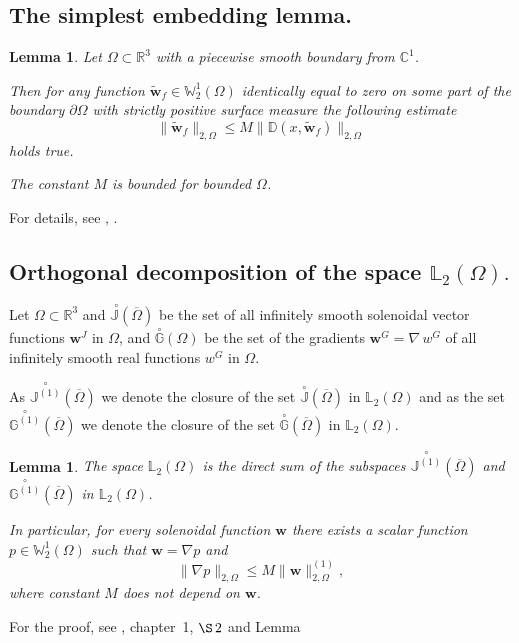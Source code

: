 \documentclass{article}
\theoremstyle{plain}
\newtheorem{lemma}[theorem]{Lemma}
\theoremstyle{definition}
\numberwithin{equation}{section}
\begin{document}
\subsection{The simplest embedding lemma.}

\begin{lemma}\label{l2.8}
Let $\Omega\subset\mathbb{R}^{3}$ with a piecewise smooth boundary from $\mathbb{C}^{1}$.

Then for any function $\widetilde{\boldsymbol{w}}_{f}\in\mathbb{W}^{1}_{2}(\Omega)$ identically equal to zero on some part of the boundary $\partial\Omega$ with strictly positive surface measure the following estimate
\begin{equation}\label{eq2.8}
\|\widetilde{\boldsymbol{w}}_{f}\|_{2,\Omega}\leqslant{M}
\|\mathbb{D}(x,\widetilde{\boldsymbol{w}}_{f})\|_{2,\Omega}
\end{equation}
holds true.

The constant ${M}$ is bounded for bounded $\Omega$.
\end{lemma}
For details, see \cite{5}, \cite{21}.

\subsection{Orthogonal decomposition of the space $\mathbb{L}_{2}(\Omega).$}

Let $\Omega\subset\mathbb{R}^{3}$ and $\stackrel{\,\,\!\!\circ}{\mathbb{J}}(\overline{\Omega})$ be the set of all infinitely smooth solenoidal vector functions $\boldsymbol{w}^{J}$ in $\Omega$, and $\stackrel{\!\!\circ}{\mathbb{G}}(\Omega)$ be the set of the gradients $\boldsymbol{w}^{G}=\nabla\,{w}^{G}$ of all infinitely smooth real functions ${w}^{G}$ in $\Omega$.

As $\stackrel{\!\!\circ}{\mathbb{J}^{(1)}}(\overline{\Omega})$ we denote the closure of the set $\stackrel{\!\!\circ}{\mathbb{J}}(\overline{\Omega})$ in $\mathbb{L}_{2}(\Omega)$ and as the set $\stackrel{\!\!\circ}{\mathbb{G}^{(1)}}(\overline{\Omega})$ we denote the closure of the set $\stackrel{\!\!\circ}{\mathbb{G}}(\overline{\Omega})$ in $\mathbb{L}_{2}(\Omega)$.

\begin{lemma}\label{l2.9}
The space $\mathbb{L}_{2}(\Omega)$ is the direct sum of the subspaces $\stackrel{\!\!\circ}{\mathbb{J}^{(1)}}({\overline\Omega})$ and $\stackrel{\!\!\circ}{\mathbb{G}^{(1)}}(\overline{\Omega})$ in $\mathbb{L}_{2}(\Omega)$.

In particular, for every solenoidal function $\boldsymbol{w}$ there exists a scalar function 
${p}\in\mathbb{W}^{1}_{2}(\Omega)$ such that $\boldsymbol{w}=\nabla{p}$ and 
\begin{equation*}
\|\nabla{p}\|_{2,\Omega}\leqslant{M}\|\boldsymbol{w}\|^{(1)}_{2,\Omega},
\end{equation*}
where constant $M$ does not depend on $\boldsymbol{w}$.
\end{lemma}
For the proof, see \cite{11}, chapter~1, $\S\,2$ and Lemma
\end{document}
